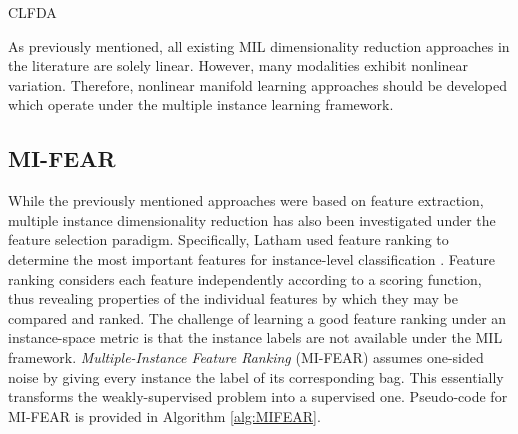 \begin{algorithm}[h!]
	\caption{CLFDA}
	\label{alg:CLFDA}
	\begin{algorithmic}[1]
		\Else
		\EndIf
		\EndFor             
	\end{algorithmic}
\end{algorithm}

As previously mentioned, all existing MIL dimensionality reduction approaches in the literature are solely linear.  However, many modalities exhibit nonlinear variation.  Therefore, nonlinear manifold learning approaches should be developed which operate under the multiple instance learning framework. 

\subsection{MI-FEAR} \label{sec:MIFEAR}
While the previously mentioned approaches were based on feature extraction,  multiple instance dimensionality reduction has also been investigated under the feature selection paradigm.  Specifically, Latham used feature ranking to determine the most important features for instance-level classification \citep{Latham2015MIFeatureRankingThesis}.  Feature ranking considers each feature independently according to a scoring function, thus revealing properties of the individual features by which they may be compared and ranked.  The challenge of learning a good feature ranking under an instance-space metric is that the instance labels are not available under the MIL framework.  \textit{Multiple-Instance Feature Ranking} (MI-FEAR) assumes one-sided noise by giving every instance the label of its corresponding bag.  This essentially transforms the weakly-supervised problem into a supervised one.  Pseudo-code for MI-FEAR is provided in Algorithm \ref{alg:MIFEAR}.

